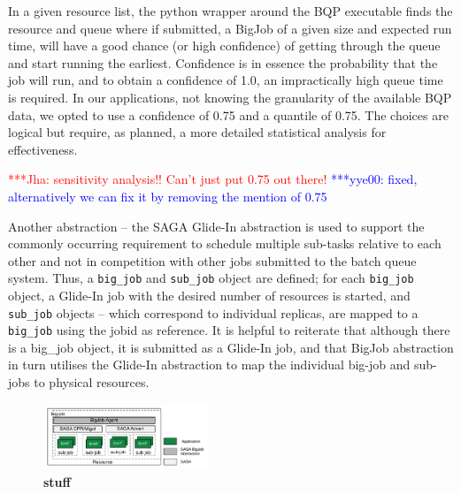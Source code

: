 \documentclass[conference,final]{IEEEtran}
\newcommand{\jhanote}[1]{ {\textcolor{red} { ***Jha: #1 }}}
\newcommand{\yyenote}[1]{ {\textcolor{blue} { ***yye00: #1 }}}
\newcommand{\jhanote}[1]{}
\newcommand{\yyenote}[1]{}
\begin{document}
In a given resource list, the python wrapper around the BQP executable
finds the resource and queue where if submitted, a BigJob of a
given size and expected run time, will have a good chance (or high
confidence) of getting through the queue and start running the
earliest. Confidence is in essence the probability that the job will
run, and to obtain a confidence of 1.0, an impractically high queue time is
required. In our applications, not knowing the granularity of the
available BQP data, we opted to use a confidence of 0.75
and a quantile of 0.75. The choices are logical but require, as planned,
a more detailed statistical analysis for effectiveness.

\jhanote{sensitivity analysis!! Can't just put
  0.75 out there!}  \yyenote{fixed, alternatively we can fix it by removing
  the mention of 0.75}
 





Another abstraction
-- the SAGA Glide-In abstraction is used to support the commonly
occurring requirement to schedule multiple sub-tasks relative to each
other and not in competition with other jobs submitted to the batch
queue system.  Thus, a \texttt{big\_job} and \texttt{sub\_job} object
are defined; for each \texttt{big\_job} object, a Glide-In job with
the desired number of resources is started, and \texttt{sub\_job}
objects -- which correspond to individual replicas, are mapped to a
\texttt{big\_job} using the jobid as reference. It is helpful to
reiterate that although there is a big\_job object, it is submitted
as a Glide-In job, and that BigJob abstraction in turn utilises the
Glide-In abstraction to map the individual big-job and sub-jobs to
physical resources.

\begin{figure}[t]
      \centering
      \includegraphics[width=0.44\textwidth]{./figures/enkf_bigjob.pdf}
      \caption{\footnotesize \bf stuff }
      \label{fig:abstractions}
\end{figure}
\end{document}
